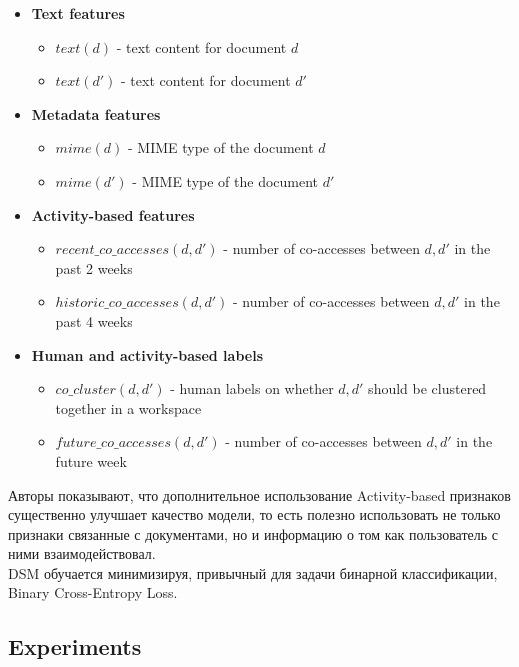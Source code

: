 \begin{itemize}
    \item \textbf{Text features}
        \begin{itemize}
            \item $text(d)$ - text content for document $d$
            \item $text(d')$ - text content for document $d'$
        \end{itemize}
    \item \textbf{Metadata features}
        \begin{itemize}
            \item $mime(d)$ - MIME type of the document $d$
            \item $mime(d')$ - MIME type of the document $d'$
        \end{itemize}
    \item \textbf{Activity-based features}
        \begin{itemize}
            \item $recent\_co\_accesses(d, d')$ - number of co-accesses between $d, d'$ in the past 2 weeks
            \item $historic\_co\_accesses(d, d')$ - number of co-accesses between $d, d'$ in the past 4 weeks
        \end{itemize}
    \item \textbf{Human and activity-based labels}
        \begin{itemize}
            \item $co\_cluster(d, d')$ - human labels on whether $d, d'$ should be clustered together in a workspace
            \item $future\_co\_accesses(d, d')$ - number of co-accesses between $d, d'$ in the future week
        \end{itemize}
\end{itemize}

Авторы показывают, что дополнительное использование Activity-based  признаков существенно улучшает качество модели, то есть полезно использовать не только признаки связанные с документами, но и информацию о том как пользователь с ними взаимодействовал. \\

DSM обучается минимизируя, привычный для задачи бинарной классификации, Binary Cross-Entropy Loss.

\subsection*{Experiments}

